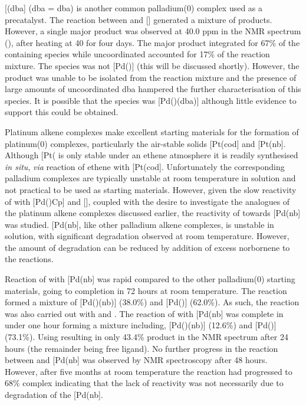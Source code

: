 [(\acrshort{dba}] (\acrshort{dba} = \acrlong{dba}) is another common palladium(0) complex used as a precatalyst.  The reaction between \tButhixantphos{} and [] generated a mixture of products.   However, a single major product was observed at 40.0 ppm in the \phosphorus{} NMR spectrum (), after heating at 40\degC{} for four days.  The major product integrated for 67\% of the \phosphorus{} containing species while uncoordinated \tButhixantphos{} accounted for 17\% of the reaction mixture.  The species was not [Pd(\tButhixantphos)] (this will be discussed shortly).  However, the product was unable to be isolated from the reaction mixture and the presence of large amounts of uncoordinated dba hampered the further characterisation of this species.  It is possible that the species was [Pd(\tButhixantphos)(dba)] although little evidence to support this could be obtained.  

Platinum alkene complexes make excellent starting materials for the formation of platinum(0) complexes, particularly the air-stable solids [Pt(cod] and [Pt(nb].\cite{Green1975b, Green1977c}  Although [Pt(\ce{C2H4)3]} is only stable under an ethene atmosphere it is readily synthesised \emph{in situ}, \emph{via} reaction of ethene with [Pt(cod].\cite{Spencer1979}  Unfortunately the corresponding palladium complexes are typically unstable at room temperature in solution and not practical to be used as starting materials.\cite{Green1977}  However, given the slow reactivity of \tButhixantphos{} with [Pd()Cp] and [], coupled with the desire to investigate the analogues of the platinum alkene complexes discussed earlier,  the reactivity of \tButhixantphos{} towards [Pd(nb] was studied.  [Pd(nb], like other palladium alkene complexes, is unstable in solution, with significant degradation observed at room temperature.\cite{Green1977}  However, the amount of degradation can be reduced by addition of excess norbornene to the reactions.

Reaction of \tButhixantphos{} with [Pd(nb] was rapid compared to the other palladium(0) starting materials, going to completion in 72 hours at room temperature.  The reaction formed a mixture of [Pd(\tButhixantphos)(nb)] (38.0\%) and [Pd(\tButhixantphos)] (62.0\%).  As such, the reaction was also carried out with \tBusixantphos{} and \tBuxantphos{}.  The reaction of \tBuxantphos{} with [Pd(nb] was complete in under one hour forming a mixture including, [Pd(\tBuxantphos)(nb)] (12.6\%) and [Pd(\tBuxantphos)] (73.1\%).  Using \tBusixantphos{} resulting in only 43.4\% product in the \phosphorus{} NMR spectrum after 24 hours (the remainder being free ligand).  No further progress in the reaction between \tBusixantphos{} and [Pd(nb] was observed by NMR spectroscopy after 48 hours.  However, after five months at room temperature the reaction had progressed to 68\% complex indicating that the lack of reactivity was not necessarily due to degradation of the [Pd(nb].  

